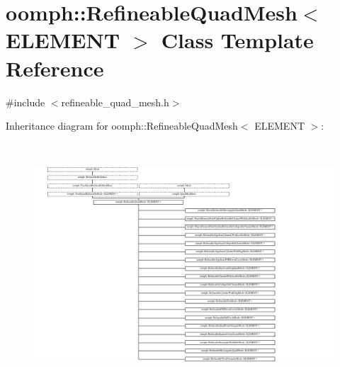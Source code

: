 \hypertarget{classoomph_1_1RefineableQuadMesh}{}\section{oomph\+:\+:Refineable\+Quad\+Mesh$<$ E\+L\+E\+M\+E\+NT $>$ Class Template Reference}
\label{classoomph_1_1RefineableQuadMesh}


{\ttfamily \#include $<$refineable\+\_\+quad\+\_\+mesh.\+h$>$}

Inheritance diagram for oomph\+:\+:Refineable\+Quad\+Mesh$<$ E\+L\+E\+M\+E\+NT $>$\+:\begin{figure}[H]
\begin{center}
\leavevmode
\includegraphics[height=9.050505cm]{classoomph_1_1RefineableQuadMesh}
\end{center}
\end{figure}
